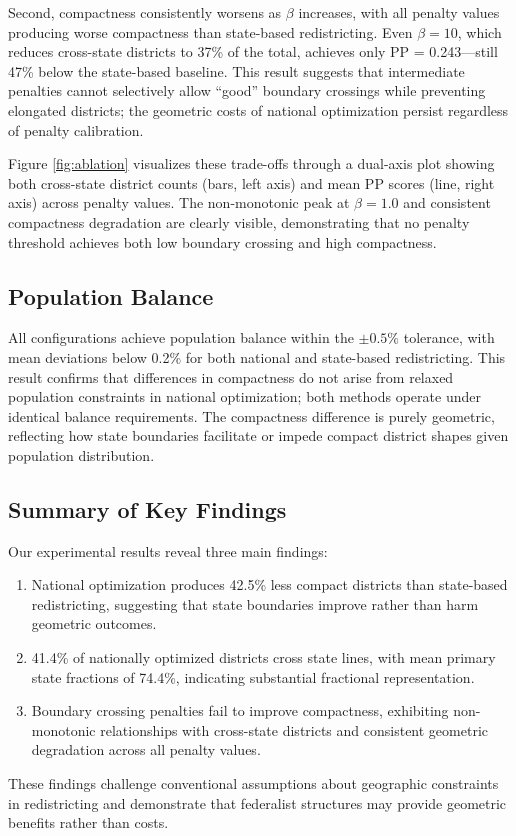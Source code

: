 Second, compactness consistently worsens as $ \beta $ increases, with all penalty values producing worse compactness than state-based redistricting. Even $ \beta = 10 $, which reduces cross-state districts to 37\% of the total, achieves only PP = 0.243---still 47\% below the state-based baseline. This result suggests that intermediate penalties cannot selectively allow ``good'' boundary crossings while preventing elongated districts; the geometric costs of national optimization persist regardless of penalty calibration.

Figure \ref{fig:ablation} visualizes these trade-offs through a dual-axis plot showing both cross-state district counts (bars, left axis) and mean PP scores (line, right axis) across penalty values. The non-monotonic peak at $ \beta = 1.0 $ and consistent compactness degradation are clearly visible, demonstrating that no penalty threshold achieves both low boundary crossing and high compactness.

\subsection{Population Balance}

All configurations achieve population balance within the $ \pm 0.5\% $ tolerance, with mean deviations below 0.2\% for both national and state-based redistricting. This result confirms that differences in compactness do not arise from relaxed population constraints in national optimization; both methods operate under identical balance requirements. The compactness difference is purely geometric, reflecting how state boundaries facilitate or impede compact district shapes given population distribution.

\subsection{Summary of Key Findings}

Our experimental results reveal three main findings:
\begin{enumerate}
    \item National optimization produces 42.5\% less compact districts than state-based redistricting, suggesting that state boundaries improve rather than harm geometric outcomes.
    \item 41.4\% of nationally optimized districts cross state lines, with mean primary state fractions of 74.4\%, indicating substantial fractional representation.
    \item Boundary crossing penalties fail to improve compactness, exhibiting non-monotonic relationships with cross-state districts and consistent geometric degradation across all penalty values.
\end{enumerate}

These findings challenge conventional assumptions about geographic constraints in redistricting and demonstrate that federalist structures may provide geometric benefits rather than costs.
